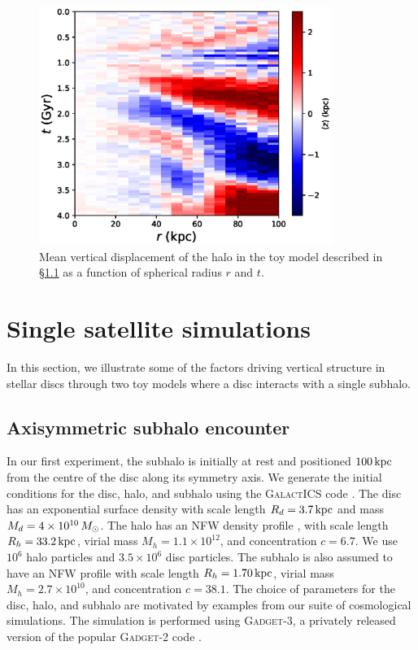 \begin{figure}
	\centering
	\includegraphics[width=0.85\textwidth]{../figures/isolated_z_0_r_a_halo.eps}
	\caption{Mean vertical displacement of the halo in the toy model described in
          \S\ref{ssec:toy_model_1} as a function of spherical radius $r$ and $t$.} 
        \label{fig:toy_model_1_mean_height_halo}
\end{figure}

\section{Single satellite simulations} \label{sec:overview}

In this section, we illustrate some of the factors driving vertical
structure in stellar discs through two toy models where a disc
interacts with a single subhalo.

\subsection{Axisymmetric subhalo encounter} 
\label{ssec:toy_model_1}

In our first experiment, the subhalo is initially at rest and
positioned $100\,{\rm kpc}$ from the centre of the disc along its
symmetry axis. We generate the initial conditions for the disc, halo,
and subhalo using the \textsc{GalactICS} code
\citep{KGGalactICSReference,WPDGalactICSReference}. The disc has an
exponential surface density with scale length $R_d=3.7\,\text{kpc}$ and mass
$M_d=4\times10^{10} \,M_\odot$. The halo has an NFW density profile
\citep{navarro_1997}, with scale length $R_h=33.2\,\text{kpc}$, virial mass
$M_h=1.1\times10^{12}$, and concentration $c=6.7$. We use $10^6$ halo
particles and $3.5 \times 10^{6}$ disc particles. The subhalo is also
assumed to have an NFW profile with scale length $R_h=1.70\,\text{kpc}$,
virial mass $M_h=2.7\times10^{10}$, and concentration $c=38.1$. The
choice of parameters for the disc, halo, and subhalo are motivated by
examples from our suite of cosmological simulations. The simulation is
performed using \textsc{Gadget-3}, a privately released version of the
popular \textsc{Gadget-2} code \citep{GadgetCodePaper}.

